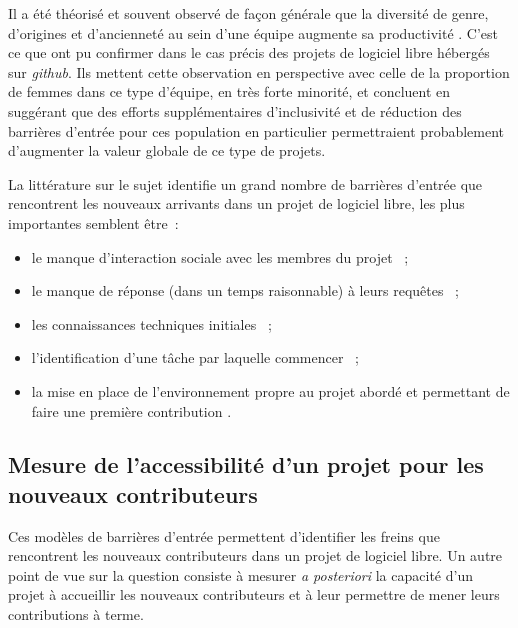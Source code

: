 \documentclass[dvipsnames]{llncs}
\newcommand{\en}[1]{\foreignlanguage{english}{\todo{fix weird hspace}\emph{#1}}}
\begin{document}
    Il a été théorisé et souvent observé de façon générale que la diversité de genre, d'origines et
    d'ancienneté au sein d'une équipe augmente sa productivité \parencite[voir par exemple][]{diversity-2007}.
    C'est ce que \textcite{diversity-2015} ont pu confirmer dans le cas précis des projets de logiciel libre
    hébergés sur \en{github}. Ils mettent cette observation en perspective avec celle de la proportion de
    femmes dans ce type d'équipe, en très forte minorité, et concluent en suggérant que des efforts
    supplémentaires d'inclusivité et de réduction des barrières d'entrée pour ces population en particulier
    permettraient probablement d'augmenter la valeur globale de ce type de projets.

    La littérature sur le sujet identifie un grand nombre de barrières d'entrée que rencontrent les nouveaux
    arrivants dans un projet de logiciel libre, les plus importantes semblent être :

    \begin{itemize}
        \item le manque d'interaction sociale avec les membres du projet
            \parencite[-1cm]{barriers-meta-2015,social-barriers-2015} ;
        \item le manque de réponse (dans un temps raisonnable) à leurs requêtes
            \parencite{barriers-meta-2015} ;
        \item les connaissances techniques initiales \parencite{barriers-meta-2015} ;
        \item l'identification d'une tâche par laquelle commencer \parencite{first-task-2015} ;
        \item la mise en place de l'environnement propre au projet abordé et permettant de faire une première
            contribution \parencite{newcomers-accessibility-2016}.
    \end{itemize}

    \subsection{Mesure de l'accessibilité d'un projet pour les nouveaux contributeurs}
    \label{sec:accessibility-measure}

    Ces modèles de barrières d'entrée permettent d'identifier les freins que rencontrent les nouveaux
    contributeurs dans un projet de logiciel libre. Un autre point de vue sur la question consiste à mesurer
    \emph{a posteriori} la capacité d'un projet à accueillir les nouveaux contributeurs et à leur permettre de
    mener leurs contributions à terme.
\end{document}

